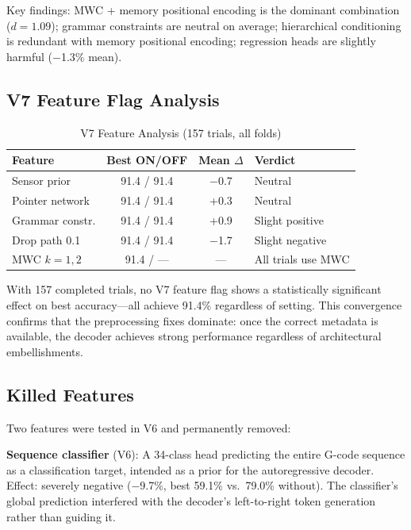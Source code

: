 \documentclass[sensors,article,submit,moreauthors,pdftex]{Definitions/mdpi}
\begin{document}
Key findings: MWC + memory positional encoding is the dominant combination ($d = 1.09$); grammar constraints are neutral on average; hierarchical conditioning is redundant with memory positional encoding; regression heads are slightly harmful ($-$1.3\% mean).

\subsection{V7 Feature Flag Analysis}

\begin{table}[htbp]
\centering
\caption{V7 Feature Analysis (157 trials, all folds)}
\label{tab:v7_features}
\small
\begin{tabular}{@{}lccl@{}}
\toprule
\textbf{Feature} & \textbf{Best ON/OFF} & \textbf{Mean $\Delta$} & \textbf{Verdict} \\
\midrule
Sensor prior   & 91.4 / 91.4 & $-$0.7 & Neutral \\
Pointer network & 91.4 / 91.4 & +0.3 & Neutral \\
Grammar constr. & 91.4 / 91.4 & +0.9 & Slight positive \\
Drop path 0.1  & 91.4 / 91.4 & $-$1.7 & Slight negative \\
MWC $k{=}1,2$  & 91.4 / ---  & --- & All trials use MWC \\
\bottomrule
\end{tabular}
\normalsize
\end{table}

With 157 completed trials, no V7 feature flag shows a statistically significant effect on best accuracy---all achieve 91.4\% regardless of setting. This convergence confirms that the preprocessing fixes dominate: once the correct metadata is available, the decoder achieves strong performance regardless of architectural embellishments.

\subsection{Killed Features}

Two features were tested in V6 and permanently removed:

\textbf{Sequence classifier} (V6): A 34-class head predicting the entire G-code sequence as a classification target, intended as a prior for the autoregressive decoder. Effect: severely negative ($-$9.7\%, best 59.1\% vs.\ 79.0\% without). The classifier's global prediction interfered with the decoder's left-to-right token generation rather than guiding it.
\end{document}
